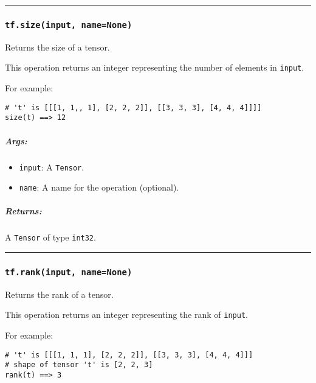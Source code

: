 \begin{center}\rule{0.5\linewidth}{\linethickness}\end{center}

\subsubsection{\texorpdfstring{\lstinline{tf.size(input, name=None)}
}{tf.size(input, name=None) }}\label{tf.sizeinput-namenone}

Returns the size of a tensor.

This operation returns an integer representing the number of elements in
\lstinline{input}.

For example:

\begin{lstlisting}
# 't' is [[[1, 1,, 1], [2, 2, 2]], [[3, 3, 3], [4, 4, 4]]]]
size(t) ==> 12
\end{lstlisting}

\subparagraph{Args: }\label{args-8}

\begin{itemize}
\tightlist
\item
  \lstinline{input}: A \lstinline{Tensor}.
\item
  \lstinline{name}: A name for the operation (optional).
\end{itemize}

\subparagraph{Returns: }\label{returns-8}

A \lstinline{Tensor} of type \lstinline{int32}.

\begin{center}\rule{0.5\linewidth}{\linethickness}\end{center}

\subsubsection{\texorpdfstring{\lstinline{tf.rank(input, name=None)}
}{tf.rank(input, name=None) }}\label{tf.rankinput-namenone}

Returns the rank of a tensor.

This operation returns an integer representing the rank of
\lstinline{input}.

For example:

\begin{lstlisting}
# 't' is [[[1, 1, 1], [2, 2, 2]], [[3, 3, 3], [4, 4, 4]]]
# shape of tensor 't' is [2, 2, 3]
rank(t) ==> 3
\end{lstlisting}

